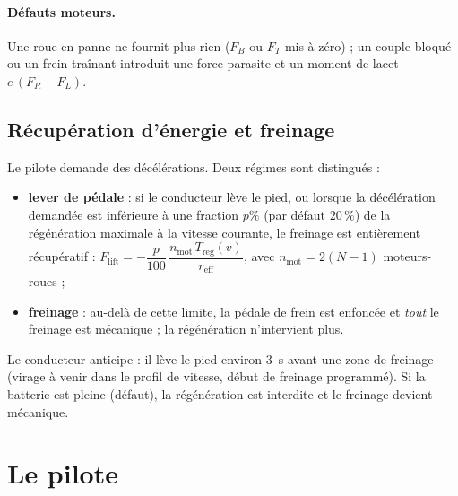 \documentclass[11pt,a4paper]{article}
\begin{document}
\paragraph{Défauts moteurs.} Une roue en panne ne fournit plus rien ($F_B$ ou $F_T$ mis à zéro) ; un couple bloqué ou un frein traînant introduit une force parasite et un moment de lacet $e\,(F_{R}-F_{L})$.

\subsection{Récupération d'énergie et freinage}
Le pilote demande des décélérations. Deux régimes sont distingués :
\begin{itemize}
 \item \textbf{lever de pédale} : si le conducteur lève le pied, ou lorsque la décélération demandée est inférieure à une fraction $p\%$ (par défaut $20\,\%$) de la régénération maximale à la vitesse courante, le freinage est entièrement récupératif : $F_{\text{lift}}=-\dfrac{p}{100}\,\dfrac{n_{\text{mot}}\,T_{\text{reg}}(v)}{r_{\text{eff}}}$, avec $n_{\text{mot}}=2(N-1)$ moteurs-roues ;
 \item \textbf{freinage} : au-delà de cette limite, la pédale de frein est enfoncée et \emph{tout} le freinage est mécanique ; la régénération n'intervient plus.
\end{itemize}
Le conducteur anticipe : il lève le pied environ \SI{3}{s} avant une zone de freinage (virage à venir dans le profil de vitesse, début de freinage programmé). Si la batterie est pleine (défaut), la régénération est interdite et le freinage devient mécanique.

\section{Le pilote}
\end{document}

